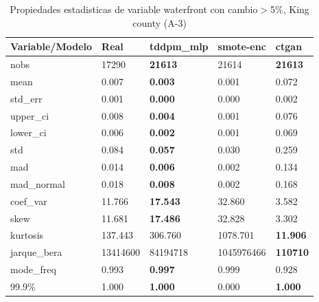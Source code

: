 \begin{table}[H]
\centering
\fontsize{8}{14}\selectfont
\caption{Propiedades estadisticas de variable waterfront con cambio\ensuremath{>}5\%, King county (A-3)}
\label{table-stats-king county-a-3-waterfront-short}
\begin{tabular}{|l|m{10em}|m{10em}|m{10em}|m{10em}|}
\hline
 \rowcolor[gray]{0.8}
Variable/Modelo & Real & tddpm\_mlp & smote-enc & ctgan \\
\hline nobs & 17290 & \bfseries 21613 & \cellcolor[rgb]{0.9, 0.54, 0.52} 21614 & \bfseries 21613 \\
\hline mean & 0.007 & \bfseries 0.003 & 0.001 & \cellcolor[rgb]{0.9, 0.54, 0.52} 0.072 \\
\hline std\_err & 0.001 & \bfseries 0.000 & 0.000 & \cellcolor[rgb]{0.9, 0.54, 0.52} 0.002 \\
\hline upper\_ci & 0.008 & \bfseries 0.004 & 0.001 & \cellcolor[rgb]{0.9, 0.54, 0.52} 0.076 \\
\hline lower\_ci & 0.006 & \bfseries 0.002 & 0.001 & \cellcolor[rgb]{0.9, 0.54, 0.52} 0.069 \\
\hline std & 0.084 & \bfseries 0.057 & 0.030 & \cellcolor[rgb]{0.9, 0.54, 0.52} 0.259 \\
\hline mad & 0.014 & \bfseries 0.006 & 0.002 & \cellcolor[rgb]{0.9, 0.54, 0.52} 0.134 \\
\hline mad\_normal & 0.018 & \bfseries 0.008 & 0.002 & \cellcolor[rgb]{0.9, 0.54, 0.52} 0.168 \\
\hline coef\_var & 11.766 & \bfseries 17.543 & \cellcolor[rgb]{0.9, 0.54, 0.52} 32.860 & 3.582 \\
\hline skew & 11.681 & \bfseries 17.486 & \cellcolor[rgb]{0.9, 0.54, 0.52} 32.828 & 3.302 \\
\hline kurtosis & 137.443 & 306.760 & \cellcolor[rgb]{0.9, 0.54, 0.52} 1078.701 & \bfseries 11.906 \\
\hline jarque\_bera & 13414600 & 84194718 & \cellcolor[rgb]{0.9, 0.54, 0.52} 1045976466 & \bfseries 110710 \\
\hline mode\_freq & 0.993 & \bfseries 0.997 & 0.999 & \cellcolor[rgb]{0.9, 0.54, 0.52} 0.928 \\
\hline 99.9\% & 1.000 & \bfseries 1.000 & \cellcolor[rgb]{0.9, 0.54, 0.52} 0.000 & \bfseries 1.000 \\
\hline
\end{tabular}
\end{table}

